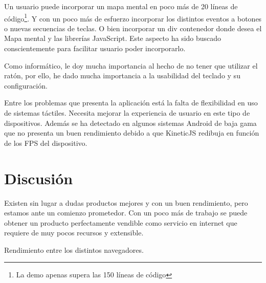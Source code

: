 Un usuario puede incorporar un mapa mental en poco más de 20 líneas de código\footnote{La demo apenas supera las 150 líneas de código}. Y con un poco más de esfuerzo incorporar los distintos eventos a botones o nuevas secuencias de teclas. O bien incorporar un div contenedor donde desea el Mapa mental y las librerías JavaScript. Este aspecto ha sido buscado conscientemente para facilitar usuario poder incorporarlo. 



Como informático, le doy mucha importancia al hecho de no tener que utilizar el ratón, por ello, he dado mucha importancia a la usabilidad del teclado y su configuración. 

Entre los problemas que presenta la aplicación está la falta de flexibilidad en uso de sistemas táctiles. Necesita mejorar la experiencia de usuario en este tipo de dispositivos. Además se ha detectado en algunos sistemas Android de baja gama que no presenta un buen rendimiento debido a que KineticJS redibuja en función de los FPS del dispositivo. 

\section{Discusión}

Existen sin lugar a dudas productos mejores y con un buen rendimiento, pero estamos ante un comienzo prometedor. Con un poco más de trabajo se puede obtener un producto perfectamente vendible como servicio en internet que requiere de muy pocos recursos y extensible. 

Rendimiento entre los distintos navegadores. 




